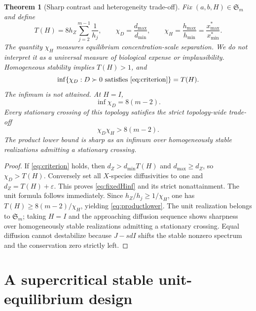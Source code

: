 \documentclass[11pt]{article}
\newtheorem{theorem}{Theorem}[section]
\theoremstyle{definition}
\newcommand{\1}{\mathbf 1}
\begin{document}
\begin{theorem}[Sharp contrast and heterogeneity trade-off]\label{thm:contrast}
Fix $(a,b,H)\in\mathfrak S_m$ and define
\begin{equation}\label{eq:TH}
 T(H)=8h_Z\sum_{j=2}^{m-1}\frac1{h_j},\qquad
 \chi_D=\frac{d_{\max}}{d_{\min}},\qquad
 \chi_H=\frac{h_{\max}}{h_{\min}}=
 \frac{x^*_{\max}}{x^*_{\min}}.
\end{equation}
The quantity $\chi_H$ measures equilibrium concentration-scale separation.
We do not interpret it as a universal measure of biological expense or
implausibility.
Homogeneous stability implies $T(H)>1$, and
\begin{equation}\label{eq:fixedHinf}
 \inf\{\chi_D:D\succ0\text{ satisfies \eqref{eq:criterion}}\}=T(H).
\end{equation}
The infimum is not attained.  At $H=I$,
\begin{equation}\label{eq:unitinf}
 \inf\chi_D=8(m-2).
\end{equation}
Every stationary crossing of this topology satisfies the strict topology-wide
trade-off
\begin{equation}\label{eq:productlower}
 \boxed{\quad \chi_D\chi_H>8(m-2).\quad}
\end{equation}
The product lower bound is sharp as an infimum over homogeneously stable
realizations admitting a stationary crossing.
\end{theorem}

\begin{proof}
If \eqref{eq:criterion} holds, then
$d_Z>d_{\min}T(H)$ and $d_{\max}\ge d_Z$, so $\chi_D>T(H)$.
Conversely set all $X$-species diffusivities to one and
$d_Z=T(H)+\varepsilon$.  This proves \eqref{eq:fixedHinf} and its strict
nonattainment.  The unit formula follows immediately.  Since
$h_Z/h_j\ge1/\chi_H$, one has
$T(H)\ge8(m-2)/\chi_H$, yielding \eqref{eq:productlower}.  The unit realization belongs to $\mathfrak S_m$; taking $H=I$ and the approaching diffusion sequence shows sharpness over homogeneously stable realizations admitting a stationary crossing.
Equal diffusion cannot destabilize because $J-sdI$ shifts the stable nonzero
spectrum and the conservation zero strictly left.
\end{proof}

\section{A supercritical stable unit-equilibrium design}
\end{document}
